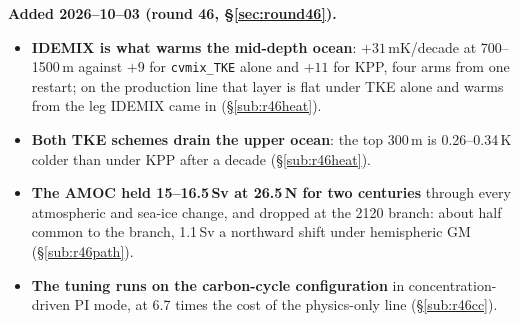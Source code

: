 \documentclass[10pt]{article}
\begin{document}
\textbf{Added 2026--10--03 (round 46, \S\ref{sec:round46}).}
\begin{itemize}\itemsep2pt
\item \textbf{IDEMIX is what warms the mid-depth ocean}: $+31$\,mK/decade at 700--1500\,m against
$+9$ for \texttt{cvmix\_TKE} alone and $+11$ for KPP, four arms from one restart; on the production
line that layer is flat under TKE alone and warms from the leg IDEMIX came in (\S\ref{sub:r46heat}).
\item \textbf{Both TKE schemes drain the upper ocean}: the top 300\,m is 0.26--0.34\,K colder than
under KPP after a decade (\S\ref{sub:r46heat}).
\item \textbf{The AMOC held 15--16.5\,Sv at 26.5\,N for two centuries} through every atmospheric and
sea-ice change, and dropped at the 2120 branch: about half common to the branch, 1.1\,Sv a northward
shift under hemispheric GM (\S\ref{sub:r46path}).
\item \textbf{The tuning runs on the carbon-cycle configuration} in concentration-driven PI mode, at
6.7 times the cost of the physics-only line (\S\ref{sub:r46cc}).
\end{itemize}
\end{document}
